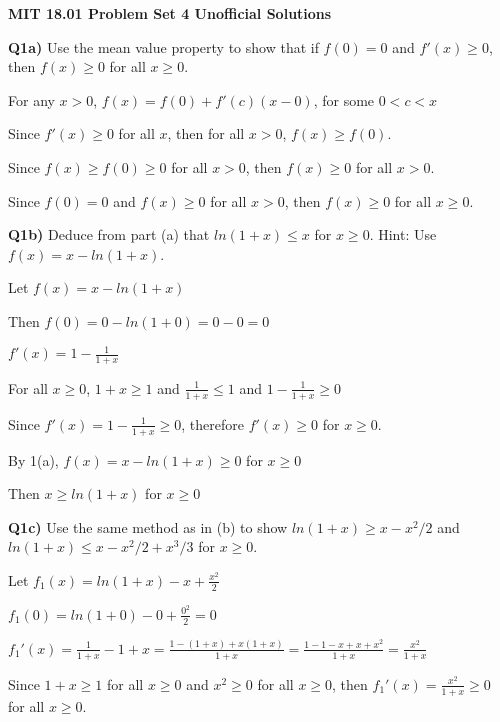 \documentclass[9pt]{article}
\begin{document}
\begin{center}
  \large\textbf{MIT 18.01 Problem Set 4 Unofficial Solutions}
\end{center}

\begin{tcolorbox}
  \textbf{Q1a)} Use the mean value property to show that if $f(0) = 0$ and $f'(x) \geq 0$, then $f(x) \geq 0$ for all $x \geq 0$.
\end{tcolorbox}

For any $x > 0$, $f(x) = f(0) + f'(c)(x - 0)$, for some $0 < c < x$

Since $f'(x) \geq 0$ for all $x$, then for all $x > 0$, $f(x) \geq f(0)$.

Since $f(x) \geq f(0) \geq 0$ for all $x > 0$, then $f(x) \geq 0$ for all $x > 0$.

Since $f(0) = 0$ and $f(x) \geq 0$ for all $x > 0$, then $f(x) \geq 0$ for all $x \geq 0$.


\begin{tcolorbox}
  \textbf{Q1b)} Deduce from part (a) that $ln(1 + x) \leq x$ for $x \geq 0$. Hint: Use $f(x) = x - ln(1 + x)$.
\end{tcolorbox}

Let $f(x) = x - ln(1 + x)$

Then $f(0) = 0 - ln(1 + 0) = 0 - 0 = 0$

$f'(x) = 1 - \frac{1}{1 + x}$

For all $x \geq 0$, $1 + x \geq 1$ and $\frac{1}{1 + x} \leq 1$ and $1 - \frac{1}{1 + x} \geq 0$

Since $f'(x) = 1 - \frac{1}{1 + x} \geq 0$, therefore $f'(x) \geq 0$ for $x \geq 0$.

By 1(a), $f(x) = x - ln(1 + x) \geq 0$ for $x \geq 0$

Then $x \geq ln(1 + x)$ for $x \geq 0$


\begin{tcolorbox}
  \textbf{Q1c)} Use the same method as in (b) to show $ln(1 + x) \geq x - x^2 / 2$ and $ln(1 + x) \leq x - x^2 / 2 + x^3 / 3$ for $x \geq 0$.
\end{tcolorbox}

Let $f_1(x) = ln(1 + x) - x + \frac{x^2}{2}$

$f_1(0) = ln(1 + 0) - 0 + \frac{0^2}{2} = 0$

$f_1'(x) = \frac{1}{1 + x} - 1 + x = \frac{1 - (1 + x) + x(1 + x)}{1 + x} = \frac{1 - 1 - x + x + x^2}{1 + x} = \frac{x^2}{1 + x}$

Since $1 + x \geq 1$ for all $x \geq 0$ and $x^2 \geq 0$ for all $x \geq 0$, then $f_1'(x) = \frac{x^2}{1 + x} \geq 0$ for all $x \geq 0$.
\end{document}
